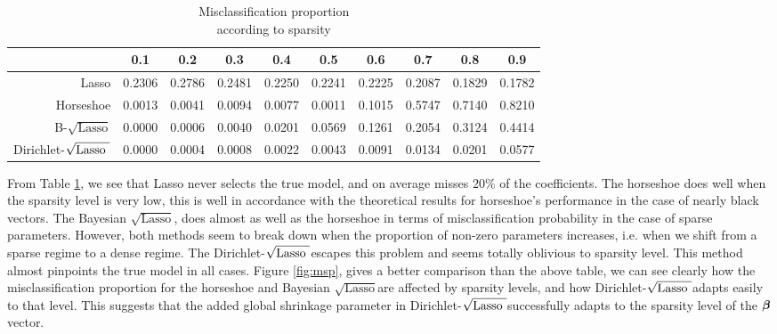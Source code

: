 \documentclass[10pt]{article}
\def\sql{$\sqrt{\text{Lasso}}$}
\def\sqdl{Dirichlet-$\sqrt{\text{\rm{Lasso} }}$}
\begin{document}
\begin{table}[h!]
\caption{Misclassification proportion \\ according to sparsity}\label{table:msp}
\begin{center}
\footnotesize{
\begin{tabular}{c|c|c|c|c|c|c|c|c|c|}
\cline{2-10}
    & 0.1  &  0.2  &  0.3  &  0.4  &  0.5 &   0.6  &  0.7  &  0.8 &   0.9 	\\
\hline
\multicolumn{1}{|r|}{Lasso} &  0.2306 & 0.2786 & 0.2481 & 0.2250 & 0.2241 & 0.2225 & 0.2087 & 0.1829 & 0.1782	\\
\hline
\multicolumn{1}{|r|}{Horseshoe} &  0.0013 & 0.0041 & 0.0094 & 0.0077 & 0.0011 & 0.1015 & 0.5747 & 0.7140 & 0.8210\\
\hline
\multicolumn{1}{|r|}{B-\sql} & 0.0000 & 0.0006 & 0.0040 & 0.0201 & 0.0569 & 0.1261 & 0.2054 & 0.3124 & 0.4414 \\
\hline
\multicolumn{1}{|r|}{\sqdl} & 0.0000 & 0.0004 & 0.0008 & 0.0022 & 0.0043 & 0.0091 & 0.0134 & 0.0201 & 0.0577 \\
\hline
\end{tabular}}
\end{center}

\end{table}

From Table \ref{table:msp}, we see that Lasso never selects the true model, and on average misses $20 \% $ of the coefficients. The horseshoe does well when the sparsity  level is very low, this is well in accordance with the theoretical results for horseshoe's performance in the case of nearly black vectors. The Bayesian \sql, does almost as well as the horseshoe in terms of misclassification probability in the case of sparse parameters. However, both methods seem to break down when the proportion of non-zero parameters increases, i.e. when we shift from a sparse regime to a dense regime. The \sqdl escapes this problem and seems totally oblivious to sparsity level. This method almost pinpoints the true model in all cases. Figure \ref{fig:msp}, gives a better comparison than the above table, we can see clearly how the misclassification proportion for the horseshoe and Bayesian \sql are affected by sparsity levels, and how \sqdl adapts easily to that level. This suggests that the added global shrinkage parameter in \sqdl  successfully adapts to the sparsity level of the $\boldsymbol{\beta}$ vector. 
\end{document}
